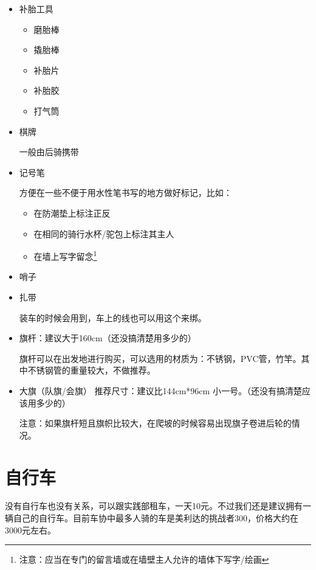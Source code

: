 \documentclass{ctexbook}
\begin{document}
\begin{itemize}
        \item 补胎工具
        \begin{itemize}
            \item 磨胎棒
            \item 撬胎棒
            \item 补胎片
            \item 补胎胶
            \item 打气筒
        \end{itemize}
        \item 棋牌    
    
        一般由后骑携带
        \item 记号笔
        
        方便在一些不便于用水性笔书写的地方做好标记，比如：
        \begin{itemize}
            \item 在防潮垫上标注正反
            \item 在相同的骑行水杯/驼包上标注其主人
            \item 在墙上写字留念\footnote{注意：应当在专门的留言墙或在墙壁主人允许的墙体下写字/绘画}
        \end{itemize}

        \item 哨子
        
        \item 扎带

        装车的时候会用到，车上的线也可以用这个来绑。

        \item 旗杆：建议大于160cm（还没搞清楚用多少的）
        
        旗杆可以在出发地进行购买，可以选用的材质为：不锈钢，PVC管，竹竿。其中不锈钢管的重量较大，不做推荐。
        
        \item 大旗（队旗/会旗） 推荐尺寸：建议比144cm*96cm 小一号。（还没有搞清楚应该用多少的）
        
        注意：如果旗杆短且旗帜比较大，在爬坡的时候容易出现旗子卷进后轮的情况。
    \end{itemize}

    \section{自行车} 
    
    没有自行车也没有关系，可以跟实践部租车，一天10元。不过我们还是建议拥有一辆自己的自行车。目前车协中最多人骑的车是美利达的挑战者300，价格大约在3000元左右。
\end{document}
